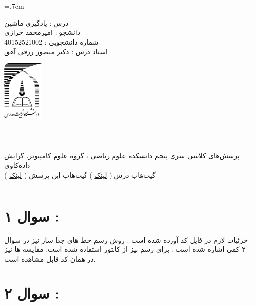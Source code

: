 \documentclass[a4paper, 12pt]{article}
\begin{document}
	
\noindent
\begin{minipage}[c]{5cm}
	\baselineskip=.7cm
	\begin{flushright}
		درس : یادگیری ماشین 
		\\
		دانشجو :
		امیرمحمد خرازی
		\\
		شماره دانشجویی :
		40152521002 
		\\
		استاد درس :  
		\href{mrezghi.ir}{دکتر منصور رزقی آهق}
	\end{flushright}
\end{minipage}
\hfill
\begin{minipage}[c]{3cm}
	\begin{center}
		\href{modares.ac.ir}{
			\includegraphics[width=2cm]{logo.png}}
	\end{center}	
\end{minipage}
\\[1mm]
\hrule depth .5mm \relax
\begin{flushright}
	پرسش‌های کلاسی سری پنجم
	\hfill
	دانشکده علوم ریاضی ، گروه علوم کامپیوتر، گرایش داده‌کاوی
	\\
	\vspace{5mm}
	گیت‌هاب درس (
	\href{https://github.com/A-M-Kharazi/Machine-Learning-TMU.git}{لینک}
	)
	\hfill
	گیت‌هاب این پرسش (
	\href{https://github.com/A-M-Kharazi/Machine-Learning-TMU/tree/main/Questions/Q-Series5}{لینک}
	)
\end{flushright}

\hrule depth .5mm\relax



\section*{سوال ۱ : }

حزئیات لازم در فایل کد آورده شده است . روش رسم خط های جدا ساز نیز در سوال ۲ کمی اشاره شده است . برای رسم بیز از کانتور استفاده شده است. مقایسه ها نیز در همان کد قابل مشاهده است.


\section*{سوال ۲ : }
\end{document}
